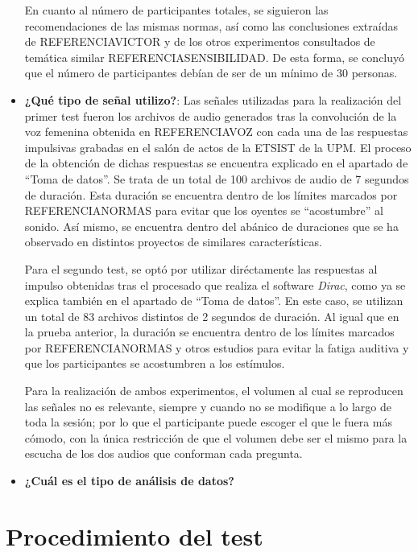 \documentclass[11pt,a4paper,twoside]{book}
\begin{document}
\begin{itemize}
                En cuanto al número de participantes totales, se siguieron las recomendaciones de las mismas normas, así como las conclusiones extraídas de REFERENCIAVICTOR y de los otros experimentos consultados de temática similar REFERENCIASENSIBILIDAD. De esta forma, se concluyó que el número de participantes debían de ser de un mínimo de 30 personas.
                \item \textbf{¿Qué tipo de señal utilizo?}: Las señales utilizadas para la realización del primer test fueron los archivos de audio generados tras la convolución de la voz femenina obtenida en REFERENCIAVOZ con cada una de las respuestas impulsivas grabadas en el salón de actos de la ETSIST de la UPM. El proceso de la obtención de dichas respuestas se encuentra explicado en el apartado de ``Toma de datos''. Se trata de un total de 100 archivos de audio de 7 segundos de duración. Esta duración se encuentra dentro de los límites marcados por REFERENCIANORMAS para evitar que los oyentes se ``acostumbre'' al  sonido. Así mismo, se encuentra dentro del abánico de duraciones que se ha observado en distintos proyectos de similares características. \newline
                
                Para el segundo test, se optó por utilizar diréctamente las respuestas al impulso obtenidas tras el procesado que realiza el software \textit{Dirac}, como ya se explica también en el apartado de ``Toma de datos''. En este caso, se utilizan un total de 83 archivos distintos de 2 segundos de duración. Al igual que en la prueba anterior, la duración se encuentra dentro de los límites marcados por REFERENCIANORMAS y otros estudios para evitar la fatiga auditiva y que los participantes se acostumbren a los estímulos.
                
                Para la realización de ambos experimentos, el volumen al cual se reproducen las señales no es relevante, siempre y cuando no se modifique a lo largo de toda la sesión; por lo que el participante puede escoger el que le fuera más cómodo, con la única restricción de que el volumen debe ser el mismo para la escucha de los dos audios que conforman cada pregunta.
                \item \textbf{¿Cuál es el tipo de análisis de datos?}
            \end{itemize}
        \section{Procedimiento del test}
        
\end{document}
